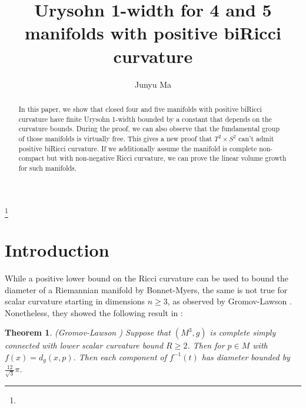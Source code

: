 \documentclass{amsart}
\newtheorem{theorem}{Theorem}[section]
\theoremstyle{definition}
\theoremstyle{remark}
\numberwithin{equation}{section}
\begin{document}
\title{Urysohn 1-width for 4 and 5 manifolds with positive biRicci curvature}

\author{Junyu Ma}
\address{University of Pennsylvania}
\thanks{}





\dedicatory{}


\begin{abstract}
 In this paper, we show that closed four and five manifolds with positive biRicci curvature have finite Urysohn 1-width bounded by a constant that depends on the curvature bounds. During the proof, we can also observe that the fundamental group of those manifolds is virtually free. This gives a new proof that $T^{2}\times S^{2}$ can't admit positive biRicci curvature. If we additionally assume the manifold is complete non-compact but with non-negative Ricci curvature, we can prove the linear volume growth for such manifolds.
\end{abstract}

\maketitle


\section{Introduction}

While a positive lower bound on the Ricci curvature can be used to bound the diameter of a Riemannian manifold by Bonnet-Myers, the same is not true for scalar curvature starting in dimensions $n\geq 3$, as observed by Gromov-Lawson \cite{GL80}. Nonetheless, they showed the following result in \cite{gl83}:

\begin{theorem}\label{thmgl}(Gromov-Lawson \cite{gl83})
    Suppose that $(M^{3},g)$ is complete simply connected with lower scalar curvature bound $R\geq 2$. Then for $p\in M$ with $f(x)=d_{g}(x,p)$. Then each component of $f^{-1}(t)$ has diameter bounded by $\frac{12}{\sqrt{3}}\pi$.
\end{theorem}
\end{document}
